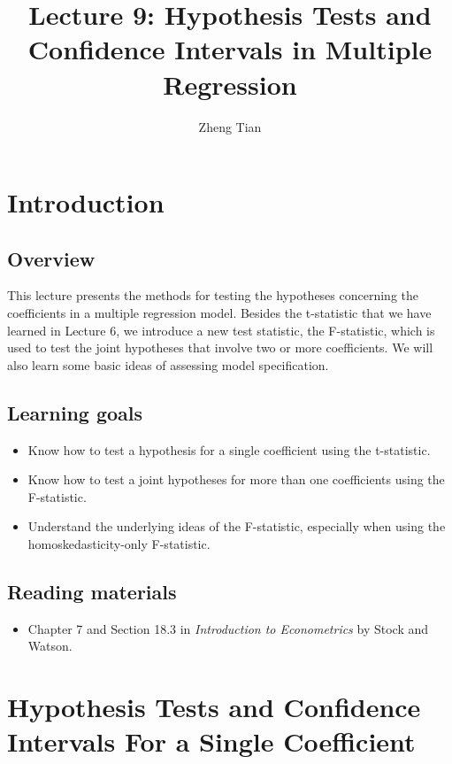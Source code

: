 \documentclass[a4paper,11pt]{article}
\author{Zheng Tian}
\date{}
\title{Lecture 9: Hypothesis Tests and Confidence Intervals in Multiple Regression}
\begin{document}
\maketitle

\section{Introduction}
\label{sec:org1a8b7d0}

\subsection{Overview}
\label{sec:org5f79219}
This lecture presents the methods for testing the hypotheses
concerning the coefficients in a multiple regression model. Besides
the t-statistic that we have learned in Lecture 6, we introduce a new
test statistic, the F-statistic, which is used to test the joint
hypotheses that involve two or more coefficients. We will also learn
some basic ideas of assessing model specification.


\subsection{Learning goals}
\label{sec:org3b0a59c}
\begin{itemize}
\item Know how to test a hypothesis for a single coefficient using the
t-statistic.
\item Know how to test a joint hypotheses for more than one coefficients
using the F-statistic.
\item Understand the underlying ideas of the F-statistic, especially when
using the homoskedasticity-only F-statistic.
\end{itemize}


\subsection{Reading materials}
\label{sec:org9921d10}
\begin{itemize}
\item Chapter 7 and Section 18.3 in \emph{Introduction to Econometrics} by
Stock and Watson.
\end{itemize}


\section{Hypothesis Tests and Confidence Intervals For a Single Coefficient}
\label{sec:org1fac125}
\end{document}
